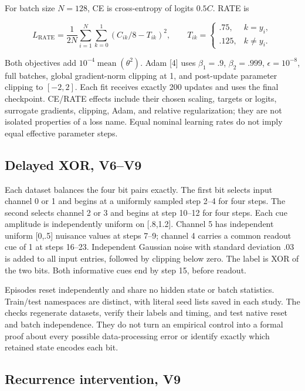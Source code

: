 \documentclass[
  10pt,
]{article}
\begin{document}
For batch size \(N=128\), CE is cross-entropy of logits \(0.5C\). RATE
is

\[
L_{\mathrm{RATE}}=\frac{1}{2N}\sum_{i=1}^N\sum_{k=0}^1
\left(C_{ik}/8-T_{ik}\right)^2,
\qquad
T_{ik}=\begin{cases}.75,&k=y_i,\\.125,&k\ne y_i.\end{cases}
\]

Both objectives add \(10^{-4}\operatorname{mean}(\theta^2)\). Adam
{[}4{]} uses \(\beta_1=.9\), \(\beta_2=.999\), \(\epsilon=10^{-8}\),
full batches, global gradient-norm clipping at 1, and post-update
parameter clipping to \([-2,2]\). Each fit receives exactly 200 updates
and uses the final checkpoint. CE/RATE effects include their chosen
scaling, targets or logits, surrogate gradients, clipping, Adam, and
relative regularization; they are not isolated properties of a loss
name. Equal nominal learning rates do not imply equal effective
parameter steps.

\subsection{Delayed XOR, V6--V9}\label{delayed-xor-v6v9}

Each dataset balances the four bit pairs exactly. The first bit selects
input channel 0 or 1 and begins at a uniformly sampled step 2--4 for
four steps. The second selects channel 2 or 3 and begins at step 10--12
for four steps. Each cue amplitude is independently uniform on
{[}.8,1.2{]}. Channel 5 has independent uniform {[}0,.5{]} nuisance
values at steps 7--9; channel 4 carries a common readout cue of 1 at
steps 16--23. Independent Gaussian noise with standard deviation .03 is
added to all input entries, followed by clipping below zero. The label
is XOR of the two bits. Both informative cues end by step 15, before
readout.

Episodes reset independently and share no hidden state or batch
statistics. Train/test namespaces are distinct, with literal seed lists
saved in each study. The checks regenerate datasets, verify their labels
and timing, and test native reset and batch independence. They do not
turn an empirical control into a formal proof about every possible
data-processing error or identify exactly which retained state encodes
each bit.

\subsection{Recurrence intervention,
V9}\label{recurrence-intervention-v9}
\end{document}
